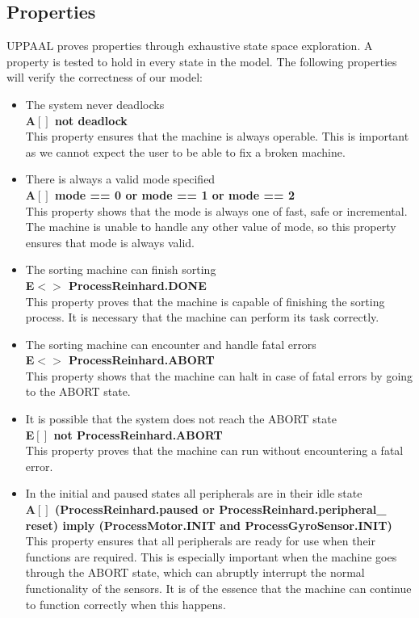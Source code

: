\documentclass[a4paper,oneside,11pt]{article}
\begin{document}
\subsection{Properties}
UPPAAL proves properties through exhaustive state space exploration. A property is tested to hold in every state in the model. The following properties will verify the correctness of our model:
\begin{itemize}
	\item The system never deadlocks\\
		\textbf{A$[]$ not deadlock}\\
		This property ensures that the machine is always operable. This is important as we cannot expect the user to be able to fix a broken machine.
	\item There is always a valid mode specified\\
		\textbf{A$[]$ mode == 0 or mode == 1 or mode == 2}\\
		This property shows that the mode is always one of fast, safe or incremental. The machine is unable to handle any other value of mode, so this property ensures that mode is always valid.
	\item The sorting machine can finish sorting\\
		\textbf{E$<>$ ProcessReinhard.DONE}\\
	This property proves that the machine is capable of finishing the sorting process. It is necessary that the machine can perform its task correctly.
	\item The sorting machine can encounter and handle fatal errors\\
		\textbf{E$<>$ ProcessReinhard.ABORT}\\
		This property shows that the machine can halt in case of fatal errors by going to the ABORT state.
	\item It is possible that the system does not reach the ABORT state\\
		\textbf{E$[]$ not ProcessReinhard.ABORT}\\
		This property proves that the machine can run without encountering a fatal error. 
	\item In the initial and paused states all peripherals are in their idle state\\
		\textbf{A$[]$ (ProcessReinhard.paused or ProcessReinhard.peripheral\_ reset) imply (ProcessMotor.INIT and ProcessGyroSensor.INIT)}\\
		This property ensures that all peripherals are ready for use when their functions are required. This is especially important when the machine goes through the ABORT state, which can abruptly interrupt the normal functionality of the sensors. It is of the essence that the machine can continue to function correctly when this happens.


\end{itemize}
\end{document}
